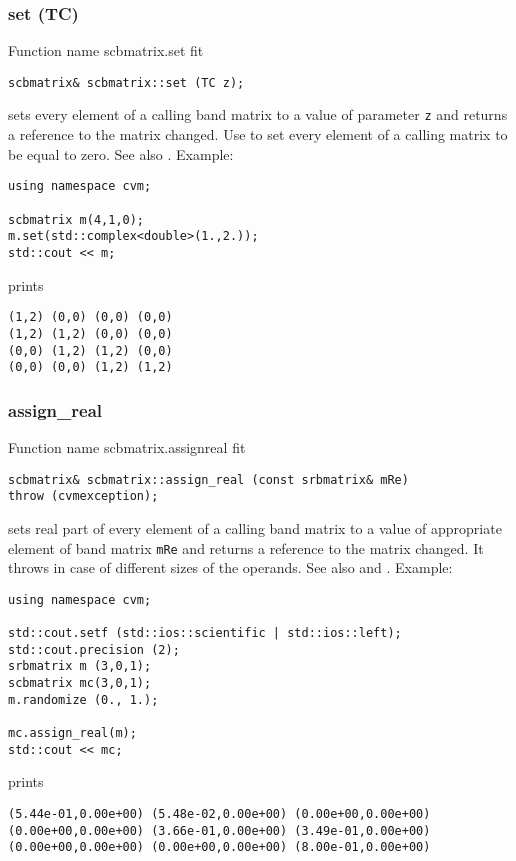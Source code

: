 \subsubsection{set (TC)}
Function%
\pdfdest name {scbmatrix.set} fit
\begin{verbatim}
scbmatrix& scbmatrix::set (TC z);
\end{verbatim}
sets every element of a calling band matrix to a value of
parameter \verb"z" and returns a reference to
the matrix changed.
Use  to set every element
of a calling matrix to be equal to zero.
See also .
Example:
\begin{Verbatim}
using namespace cvm;

scbmatrix m(4,1,0);
m.set(std::complex<double>(1.,2.));
std::cout << m;
\end{Verbatim}
prints
\begin{Verbatim}
(1,2) (0,0) (0,0) (0,0)
(1,2) (1,2) (0,0) (0,0)
(0,0) (1,2) (1,2) (0,0)
(0,0) (0,0) (1,2) (1,2)
\end{Verbatim}
\newpage




\subsubsection{assign\_real}
Function%
\pdfdest name {scbmatrix.assignreal} fit
\begin{verbatim}
scbmatrix& scbmatrix::assign_real (const srbmatrix& mRe)
throw (cvmexception);
\end{verbatim}
sets real part of every element of a calling band matrix to a value of
appropriate element of  band matrix \verb"mRe"
and returns a reference to
the matrix changed.
It throws  
in case of different sizes of the operands.
See also  and .
Example:
\begin{Verbatim}
using namespace cvm;

std::cout.setf (std::ios::scientific | std::ios::left); 
std::cout.precision (2);
srbmatrix m (3,0,1);
scbmatrix mc(3,0,1);
m.randomize (0., 1.);

mc.assign_real(m);
std::cout << mc;
\end{Verbatim}
prints
\begin{Verbatim}
(5.44e-01,0.00e+00) (5.48e-02,0.00e+00) (0.00e+00,0.00e+00)
(0.00e+00,0.00e+00) (3.66e-01,0.00e+00) (3.49e-01,0.00e+00)
(0.00e+00,0.00e+00) (0.00e+00,0.00e+00) (8.00e-01,0.00e+00)
\end{Verbatim}
\newpage




